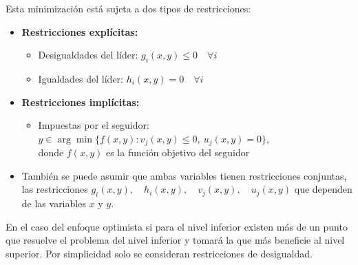 
\newpage


Esta minimización está sujeta a dos tipos de restricciones: 
\begin{itemize}
    \item \textbf{Restricciones explícitas:}
    \begin{itemize}
        \item Desigualdades del líder: \( g_i(x,y) \leq 0 \quad \forall i \)
        \item Igualdades del líder: \( h_i(x,y) = 0 \quad \forall i \)
    \end{itemize}
    
    \item \textbf{Restricciones implícitas:}
    \begin{itemize}
        \item Impuestas por el seguidor: \( y \in \arg\min\{f(x, y) : v_j(x,y) \leq 0,\ u_j(x,y) = 0\} \),\\
        donde \( f(x, y) \) es la función objetivo del seguidor
    \end{itemize}
    
	 
	\item También se puede asumir que ambas variables tienen restricciones conjuntas, las restricciones $ g_i(x,y), \quad h_i(x,y), \quad v_j(x,y), \quad u_j(x,y) $ que dependen de las variables $x$ y $y$.
	
	
\end{itemize}
En el caso del enfoque optimista si para el nivel inferior existen más de un punto que resuelve el problema del nivel inferior y tomará la que más beneficie al nivel superior. 
Por simplicidad solo se consideran restricciones de desigualdad.


